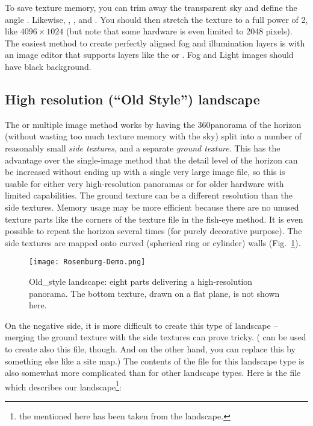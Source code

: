 %
To save texture memory, %
you can trim away the transparent
sky and define the angle . Likewise,
, ,  and
. You should then stretch the texture to a
full power of 2, like $4096\times1024$ (but note that some hardware is
even limited to 2048 pixels). The easiest method to create perfectly
aligned fog and illumination layers is with an image editor that
supports layers like the  or . Fog
and Light images should have black background.


\subsection{High resolution (``Old Style'')  landscape}
\label{sec:landscapes:oldStyle}

The  or multiple image method works by having the
360\degree panorama of the horizon (without wasting too much texture
memory with the sky) split into a number of reasonably small
\emph{side textures}, and a separate \emph{ground texture}. This has
the advantage over the single-image method that the detail level of
the horizon can be increased without ending up with a single very
large image file, so this is usable for either very high-resolution
panoramas or for older hardware with limited capabilities. The ground
texture can be a different resolution than the side textures. Memory
usage may be more efficient because there are no unused texture parts
like the corners of the texture file in the fish-eye method. It is
even possible to repeat the horizon several times (for purely
decorative purpose). The side textures are mapped onto curved
(spherical ring or cylinder) walls
(Fig.~\ref{fig:landscapes:oldStyle}).

\begin{figure}[tb]
  \centering
   \texttt{[image: Rosenburg-Demo.png]}
   \caption{Old\_style landscape: eight parts delivering a
     high-resolution panorama. The bottom texture, drawn on a flat
     plane, is not shown here.}
  \label{fig:landscapes:oldStyle}
\end{figure}

On the negative side, it is more difficult to create this type of
landscape -- merging the ground texture with the side textures can
prove tricky. ( can be used to create also this file,
though. And on the other hand, you can replace this by something else
like a site map.) The contents of the  file for
this landscape type is also somewhat more complicated than for other
landscape types. Here is the  file which describes
our  landscape\footnote{the 
   mentioned here has been taken from the
   landscape.}:


